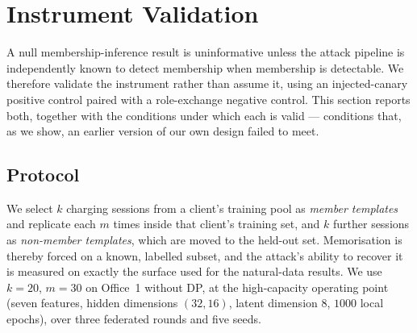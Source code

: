 %
%

\section{Instrument Validation}
\label{sec:validation}

A null membership-inference result is uninformative unless the attack
pipeline is independently known to detect membership when membership is
detectable. We therefore validate the instrument rather than assume it,
using an injected-canary positive control paired with a role-exchange
negative control. This section reports both, together with the conditions
under which each is valid --- conditions that, as we show, an earlier
version of our own design failed to meet.

\subsection{Protocol}
\label{sec:validation-protocol}

We select $k$ charging sessions from a client's training pool as
\emph{member templates} and replicate each $m$ times inside that client's
training set, and $k$ further sessions as \emph{non-member templates},
which are moved to the held-out set. Memorisation is thereby forced on a
known, labelled subset, and the attack's ability to recover it is measured
on exactly the surface used for the natural-data results. We use
$k = 20$, $m = 30$ on Office~1 without DP, at the high-capacity operating
point (seven features, hidden dimensions $(32,16)$, latent dimension $8$,
$1000$ local epochs), over three federated rounds and five seeds.

